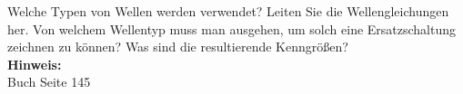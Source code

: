 \begin{question}[section=5,subsection=53,name={Verlustfreie Doppelleitung},difficulty=8,type=mdl,tags={}]
	Welche Typen von Wellen werden verwendet? Leiten Sie die Wellengleichungen her. Von welchem Wellentyp muss man ausgehen, um solch eine Ersatzschaltung zeichnen zu können? Was sind die resultierende Kenngrößen?
	\\ \textbf{Hinweis:}\\
	Buch Seite 145
\end{question}
\begin{solution}
	
\end{solution}